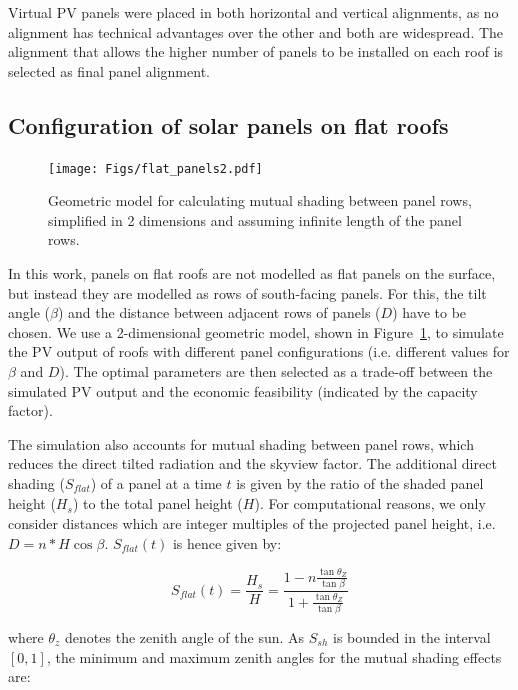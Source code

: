 Virtual PV panels were placed in both horizontal and vertical alignments, as no alignment has technical advantages over the other and both are widespread. The alignment that allows the higher number of panels to be installed on each roof is selected as final panel alignment. 


\subsection{Configuration of solar panels on flat roofs}
\label{app_flat}

\begin{figure}[tb]
	\centering
	\texttt{[image: Figs/flat\_panels2.pdf]}  
	\caption{Geometric model for calculating mutual shading between panel rows, simplified in 2 dimensions and assuming infinite length of the panel rows.}
	\label{fig:flat_concept}
\end{figure}

In this work, panels on flat roofs are not modelled as flat panels on the surface, but instead they are modelled as rows of south-facing panels. For this, the tilt angle ($\beta$) and the distance between adjacent rows of panels ($D$) have to be chosen. We use a 2-dimensional geometric model, shown in Figure~\ref{fig:flat_concept}, to simulate the PV output of roofs with different panel configurations (i.e. different values for $\beta$ and $D$). The optimal parameters are then selected as a trade-off between the simulated PV output and the economic feasibility (indicated by the capacity factor).

The simulation also accounts for mutual shading between panel rows, which reduces the direct tilted radiation and the skyview factor.
The additional direct shading ($S_{\mathit{flat}}$) of a panel at a time $t$ is given by the ratio of the shaded panel height ($H_s$) to the total panel height ($H$). For computational reasons, we only consider distances which are integer multiples of the projected panel height, i.e. $D=n*H \cos{\beta}$. $S_{\mathit{flat}}(t)$ is hence given by:

\begin{equation}
\label{eq:flat_Sh}
    S_{\mathit{flat}}(t) = \frac{H_s}{H} =  \frac{1 - n \frac{\tan{\theta_Z}}{\tan{\beta}}}
               {1 + \frac{\tan{\theta_Z}}{\tan{\beta}}}
\end{equation}

where $\theta_z$ denotes the zenith angle of the sun. As $S_{sh}$ is bounded in the interval $[0,1]$, the minimum and maximum zenith angles for the mutual shading effects are:

